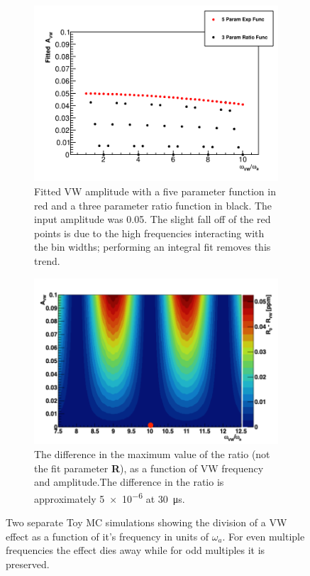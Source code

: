 \documentclass[12pt,letterpaper]{article}
\newcommand{\mus}[1]{\SI{#1}{\micro s}\xspace}
\def\wa{$\omega_{a}$\xspace}
\begin{document}
\begin{figure}[]
\centering
    \begin{subfigure}[t]{0.7\textwidth}
        \centering
        \includegraphics[width=\textwidth]{Fitted_Avw_Vs_Wvw_1x-10x} %
        \caption{Fitted VW amplitude with a five parameter function in red and a three parameter ratio function in black. The input amplitude was 0.05. The slight fall off of the red points is due to the high frequencies interacting with the bin widths; performing an integral fit removes this trend.}
    \end{subfigure}%

    \begin{subfigure}[t]{0.7\textwidth}
        \centering
        \includegraphics[width=\textwidth]{VWRatioDiff}
        \caption{The difference in the maximum value of the ratio (not the fit parameter \textbf{R}), as a function of VW frequency and amplitude.The difference in the ratio is approximately \SI{5e-6}{} at \mus{30}.}
    \end{subfigure}
\caption[]{Two separate Toy MC simulations showing the division of a VW effect as a function of it's frequency in units of \wa. For even multiple frequencies the effect dies away while for odd multiples it is preserved.}
\label{fig:ToyMCVW}
\end{figure}
\end{document}
